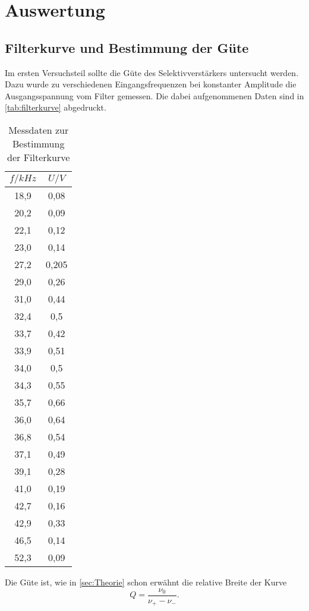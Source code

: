 \section{Auswertung}
\label{sec:Auswertung}

\subsection{Filterkurve und Bestimmung der Güte}
\label{sec:Filterkurve und Bestimmung der Güte}

Im ersten Versuchsteil sollte die Güte des Selektivverstärkers untersucht werden. Dazu
wurde zu verschiedenen Eingangsfrequenzen bei konstanter Amplitude die Ausgangsspannung
vom Filter gemessen. Die dabei aufgenommenen Daten sind in \autoref{tab:filterkurve}
abgedruckt.

\begin{table}
  \centering
  \caption{Messdaten zur Bestimmung der Filterkurve}
  \label{tab:filterkurve}
  \begin{tabular}{c c}
  \toprule
  $f / \si{kHz}$	& $U / \si{V}$ \\
  \midrule
  18,9&0,08	\\
  20,2&0,09	\\
  22,1&0,12	\\
  23,0&0,14	\\
  27,2&0,205	\\
  29,0&0,26	\\
  31,0&0,44	\\
  32,4&0,5	\\
  33,7&0,42	\\
  33,9&0,51	\\
  34,0&0,5	\\
  34,3&0,55	\\
  35,7&0,66	\\
  36,0&0,64	\\
  36,8&0,54	\\
  37,1&0,49	\\
  39,1&0,28	\\
  41,0&0,19	\\
  42,7&0,16	\\
  42,9&0,33	\\
  46,5&0,14	\\
  52,3&0,09	\\
  \bottomrule
  \end{tabular}
\end{table}

Die Güte ist, wie in \autoref{sec:Theorie} schon erwähnt die relative Breite der Kurve
\[
	Q = \frac{\nu_0}{\nu_+ - \nu_-}.
\]

